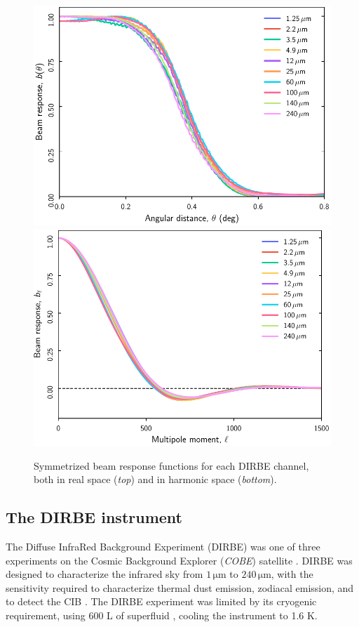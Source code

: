\documentclass{aa}
\def\COBE{\textit{COBE}}
\begin{document}
\begin{figure}
  \centering
  \includegraphics[width=\linewidth]{figs/DIRBE_beam_theta.pdf}\\
  \includegraphics[width=\linewidth]{figs/DIRBE_beam_ell.pdf}
  \caption{Symmetrized beam response functions for each DIRBE channel, both in real space (\emph{top}) and in harmonic space (\emph{bottom}).}
  \label{fig:beams}
\end{figure}




\subsection{The DIRBE instrument}

The Diffuse InfraRed Background Experiment (DIRBE) was one of three experiments on the Cosmic Background Explorer (\COBE) satellite \citep{boggess92}. DIRBE was designed to characterize the infrared sky from $1\,\mathrm{\mu m}$ to $240\,\mathrm{\mu m}$, with the sensitivity required to characterize thermal dust emission, zodiacal emission, and to detect the CIB \citep{silverberg93}. The DIRBE experiment was limited by its cryogenic requirement, using 600 L of superfluid , cooling the instrument to 1.6 K.
\end{document}
